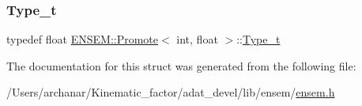 \subsubsection{\texorpdfstring{Type\_t}{Type\_t}\hspace{0.1cm}{\footnotesize\ttfamily [2/2]}}
{\footnotesize\ttfamily typedef float \mbox{\hyperlink{structENSEM_1_1Promote}{E\+N\+S\+E\+M\+::\+Promote}}$<$ int, float $>$\+::\mbox{\hyperlink{structENSEM_1_1Promote_3_01int_00_01float_01_4_af9c8f66593ece7d87835891df1c0d7e4}{Type\+\_\+t}}}



The documentation for this struct was generated from the following file\+:\begin{DoxyCompactItemize}
\item 
/\+Users/archanar/\+Kinematic\+\_\+factor/adat\+\_\+devel/lib/ensem/\mbox{\hyperlink{lib_2ensem_2ensem_8h}{ensem.\+h}}\end{DoxyCompactItemize}
